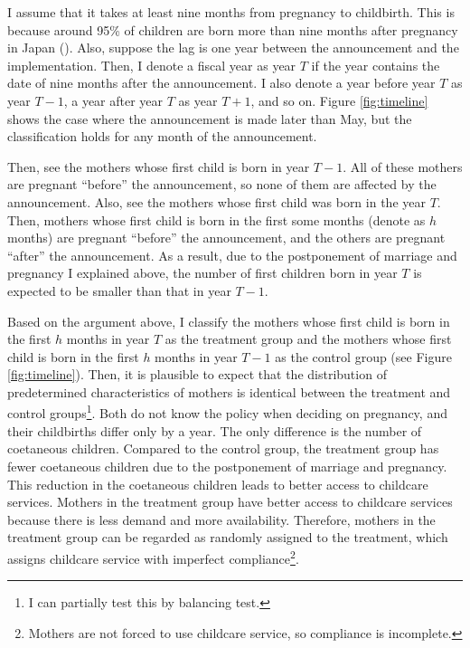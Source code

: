 \documentclass[12pt]{article}
\begin{document}
I assume that it takes at least nine months from pregnancy to childbirth.
This is because around 95\% of children are born more than nine months after pregnancy in Japan (\cite{sakata2018}).
Also, suppose the lag is one year between the announcement and the implementation.
Then, I denote a fiscal year as year $T$ if the year contains the date of nine months after the announcement.
I also denote a year before year $T$ as year $T-1$, a year after year $T$ as year $T+1$, and so on.
Figure \ref{fig:timeline} shows the case where the announcement is made later than May, but the classification holds for any month of the announcement.


Then, see the mothers whose first child is born in year $T-1$. 
All of these mothers are pregnant ``before'' the announcement, so none of them are affected by the announcement.
Also, see the mothers whose first child was born in the year $T$. 
Then, mothers whose first child is born in the first some months (denote as $h$ months) are pregnant ``before'' the announcement, and the others are pregnant ``after'' the announcement.
As a result, due to the postponement of marriage and pregnancy I explained above, the number of first children born in year $T$ is expected to be smaller than that in year $T-1$.


Based on the argument above, I classify the mothers whose first child is born in the first $h$ months in year $T$ as the treatment group and the mothers whose first child is born in the first $h$ months in year $T-1$ as the control group (see Figure \ref{fig:timeline}).
Then, it is plausible to expect that the distribution of predetermined characteristics of mothers is identical between the treatment and control groups\footnote{I can partially test this by balancing test.}.
Both do not know the policy when deciding on pregnancy, and their childbirths differ only by a year.
The only difference is the number of coetaneous children. 
Compared to the control group, the treatment group has fewer coetaneous children due to the postponement of marriage and pregnancy.
This reduction in the coetaneous children leads to better access to childcare services. 
Mothers in the treatment group have better access to childcare services because there is less demand and more availability. 
Therefore, mothers in the treatment group can be regarded as randomly assigned to the treatment, which assigns childcare service with imperfect compliance\footnote{Mothers are not forced to use childcare service, so compliance is incomplete.}.
\end{document}
